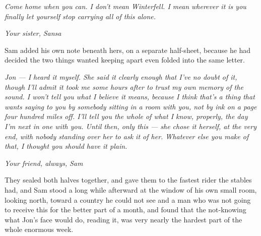 \textit{Come home when you can. I don’t mean Winterfell. I mean wherever it is you finally let yourself stop carrying all of this alone.}

\textit{Your sister,}
\textit{Sansa}

Sam added his own note beneath hers, on a separate half-sheet, because he had decided the two things wanted keeping apart even folded into the same letter.

\textit{Jon — I heard it myself. She said it clearly enough that I’ve no doubt of it, though I’ll admit it took me some hours after to trust my own memory of the sound. I won’t tell you what I believe it means, because I think that’s a thing that wants saying to you by somebody sitting in a room with you, not by ink on a page four hundred miles off. I’ll tell you the whole of what I know, properly, the day I’m next in one with you. Until then, only this — she chose it herself, at the very end, with nobody standing over her to ask it of her. Whatever else you make of that, I thought you should have it plain.}

\textit{Your friend, always,}
\textit{Sam}

They sealed both halves together, and gave them to the fastest rider the stables had, and Sam stood a long while afterward at the window of his own small room, looking north, toward a country he could not see and a man who was not going to receive this for the better part of a month, and found that the not-knowing what Jon’s face would do, reading it, was very nearly the hardest part of the whole enormous week.